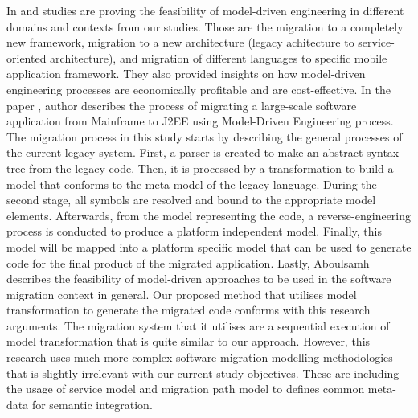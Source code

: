 \documentclass[conference]{IEEEtran}
\begin{document}
In \cite{b9} and \cite{b10} studies are proving the feasibility of model-driven engineering
in different domains and contexts from our studies. Those are the migration to a completely new framework,
migration to a new architecture (legacy achitecture to service-oriented architecture), and migration
of different languages to specific mobile application framework.
They also provided insights on how model-driven engineering processes are economically
profitable and are cost-effective.
\newline \newline
In the paper \cite{b9}, author describes the process of migrating a large-scale software application from Mainframe to J2EE
using Model-Driven Engineering process. The migration process in this study starts by describing the general
processes of the current legacy system.
First, a parser is created to make an abstract syntax tree from the legacy code. Then, it is processed
by a transformation to build a model that conforms to the meta-model of the legacy language.
During the second stage, all symbols are resolved and bound to the appropriate model elements.
Afterwards, from the model representing the code, a reverse-engineering process is conducted to produce a platform independent
model. Finally, this model will be mapped into a platform specific model that can be used to generate code
for the final product of the migrated application.
\newline \newline
Lastly, Aboulsamh describes \cite{b10} the feasibility of model-driven approaches to be used in the software migration context in general.
Our proposed method that utilises model transformation to generate the migrated code conforms with this
research arguments. The migration system that it utilises are a sequential execution of model transformation \cite{b10}
that is quite similar to our approach.
However, this research uses much more complex software migration modelling
methodologies that is slightly irrelevant with our current study objectives. These are including
the usage of service model and migration path model to defines common meta-data for semantic integration.
\end{document}
